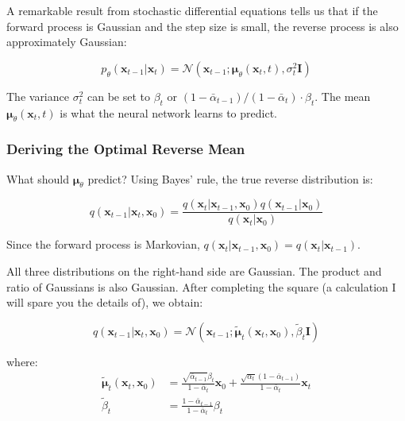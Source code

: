 A remarkable result from stochastic differential equations tells us that if the forward process is Gaussian and the step size is small, the reverse process is also approximately Gaussian:

\begin{equation}
p_\theta(\mathbf{x}_{t-1} | \mathbf{x}_t) = \mathcal{N}\left(\mathbf{x}_{t-1}; \boldsymbol{\mu}_\theta(\mathbf{x}_t, t), \sigma_t^2 \mathbf{I}\right)
\label{eq:reverse_step}
\end{equation}

The variance $\sigma_t^2$ can be set to $\beta_t$ or $(1-\bar{\alpha}_{t-1})/(1-\bar{\alpha}_t) \cdot \beta_t$. The mean $\boldsymbol{\mu}_\theta(\mathbf{x}_t, t)$ is what the neural network learns to predict.

\subsubsection{Deriving the Optimal Reverse Mean}

What should $\boldsymbol{\mu}_\theta$ predict? Using Bayes' rule, the true reverse distribution is:

\begin{equation}
q(\mathbf{x}_{t-1} | \mathbf{x}_t, \mathbf{x}_0) = \frac{q(\mathbf{x}_t | \mathbf{x}_{t-1}, \mathbf{x}_0) q(\mathbf{x}_{t-1} | \mathbf{x}_0)}{q(\mathbf{x}_t | \mathbf{x}_0)}
\label{eq:bayes_reverse}
\end{equation}

Since the forward process is Markovian, $q(\mathbf{x}_t | \mathbf{x}_{t-1}, \mathbf{x}_0) = q(\mathbf{x}_t | \mathbf{x}_{t-1})$.

All three distributions on the right-hand side are Gaussian. The product and ratio of Gaussians is also Gaussian. After completing the square (a calculation I will spare you the details of), we obtain:

\begin{equation}
q(\mathbf{x}_{t-1} | \mathbf{x}_t, \mathbf{x}_0) = \mathcal{N}\left(\mathbf{x}_{t-1}; \tilde{\boldsymbol{\mu}}_t(\mathbf{x}_t, \mathbf{x}_0), \tilde{\beta}_t \mathbf{I}\right)
\label{eq:true_reverse}
\end{equation}

where:
\begin{align}
\tilde{\boldsymbol{\mu}}_t(\mathbf{x}_t, \mathbf{x}_0) &= \frac{\sqrt{\bar{\alpha}_{t-1}}\beta_t}{1-\bar{\alpha}_t}\mathbf{x}_0 + \frac{\sqrt{\alpha_t}(1-\bar{\alpha}_{t-1})}{1-\bar{\alpha}_t}\mathbf{x}_t \label{eq:true_reverse_mean} \\
\tilde{\beta}_t &= \frac{1-\bar{\alpha}_{t-1}}{1-\bar{\alpha}_t}\beta_t \label{eq:true_reverse_var}
\end{align}

